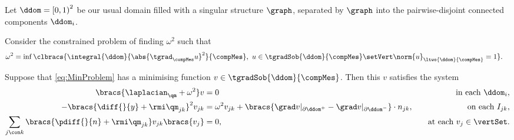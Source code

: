 \documentclass[11pt]{report}
\begin{document}
Let $\ddom=\left[0,1\right)^2$ be our usual domain filled with a singular structure $\graph$, separated by $\graph$ into the pairwise-disjoint connected components $\ddom_i$.

Consider the constrained problem of finding $\omega^2$ such that
\begin{align} \label{eq:MinProblem}
	\omega^2 &= \inf\clbracs{ \integral{\ddom}{\abs{\tgrad_{\compMes}u}^2}{\compMes}, \ u\in\tgradSob{\ddom}{\compMes} \setVert \norm{u}_{\ltwo{\ddom}{\compMes}} = 1}.
\end{align}

\begin{theorem}
	Suppose that \eqref{eq:MinProblem} has a minimising function $v\in\tgradSob{\ddom}{\compMes}$.
	Then this $v$ satisfies the system
	\begin{subequations} \label{eq:GraphSystem}
		\begin{align} 
			\bracs{\laplacian_\qm + \omega^2}v &= 0 \quad &\text{in each } \ddom_i, \\
			-\bracs{\diff{}{y}+\rmi\qm_{jk}}^2 v_{jk} &= \omega^2 v_{jk} + \bracs{\grad v\vert_{\partial\ddom^+} - \grad v\vert_{\partial\ddom^-}}\cdot n_{jk}, \quad &\text{on each } I_{jk}, \\
			\sum_{j\con k}\bracs{\pdiff{}{n} + \rmi\qm_{jk}}v_{jk}\bracs{v_j} &= 0, \quad &\text{at each } v_j\in\vertSet.
		\end{align}
	\end{subequations}
\end{theorem}
\end{document}
